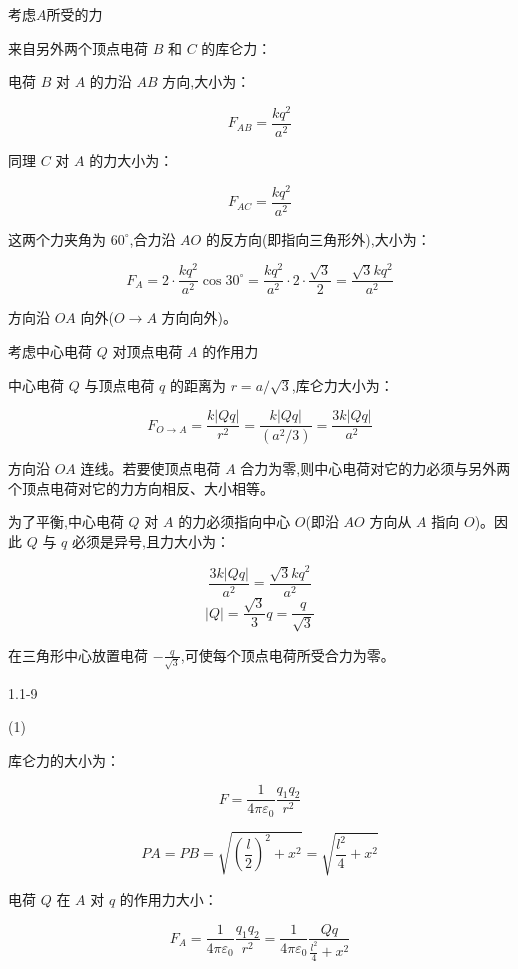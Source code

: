 \documentclass{article}
\begin{document}
考虑$A$所受的力

来自另外两个顶点电荷 $B$ 和 $C$ 的库仑力：

电荷 $B$ 对 $A$ 的力沿 $AB$ 方向,大小为：

$$F_{AB} = \frac{k q^2}{a^2}$$

同理 $C$ 对 $A$ 的力大小为：

$$F_{AC} = \frac{k q^2}{a^2}$$

这两个力夹角为 $60^\circ$,合力沿 $AO$ 的反方向(即指向三角形外),大小为：

$$F_A = 2 \cdot \frac{k q^2}{a^2} \cos 30^\circ = \frac{k q^2}{a^2} \cdot 2 \cdot \frac{\sqrt{3}}{2} = \frac{\sqrt{3} k q^2}{a^2}$$

方向沿 $OA$ 向外($O \to A$ 方向向外)。

考虑中心电荷 $Q$ 对顶点电荷 $A$ 的作用力

中心电荷 $Q$ 与顶点电荷 $q$ 的距离为 $r = a/\sqrt{3}$,库仑力大小为：

$$F_{O\to A} = \frac{k |Q q|}{r^2} = \frac{k |Q q|}{(a^2/3)} = \frac{3k |Q q|}{a^2}$$

方向沿 $OA$ 连线。若要使顶点电荷 $A$ 合力为零,则中心电荷对它的力必须与另外两个顶点电荷对它的力方向相反、大小相等。

为了平衡,中心电荷 $Q$ 对 $A$ 的力必须指向中心 $O$(即沿 $AO$ 方向从 $A$ 指向 $O$)。因此 $Q$ 与 $q$ 必须是异号,且力大小为：

$$\frac{3k |Q q|}{a^2} = \frac{\sqrt{3} k q^2}{a^2}$$
$$|Q| = \frac{\sqrt{3}}{3} q = \frac{q}{\sqrt{3}}$$

在三角形中心放置电荷 $-\frac{q}{\sqrt{3}}$,可使每个顶点电荷所受合力为零。




\newpage

1.1-9

(1)

库仑力的大小为：

$$F=\frac{1}{4\pi\varepsilon_0}\frac{q_1q_2}{r^2}$$

$$PA = PB = \sqrt{\left(\frac{l}{2}\right)^2 + x^2} = \sqrt{\frac{l^2}{4} + x^2}$$

电荷 $ Q $ 在 $ A $ 对 $ q $ 的作用力大小：

$$F_A = \frac{1}{4\pi\varepsilon_0}\frac{q_1q_2}{r^2} = \frac{1}{4\pi\varepsilon_0}\frac{Q q}{\frac{l^2}{4} + x^2}$$
\end{document}
